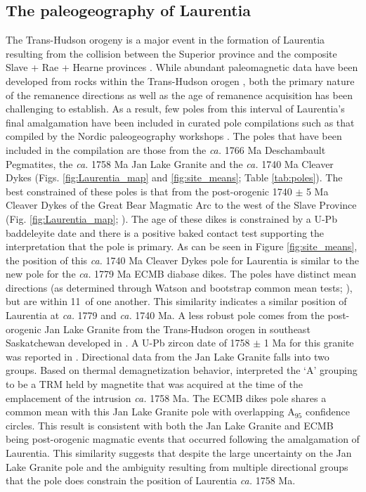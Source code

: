 \documentclass[draft]{agujournal2019}
\begin{document}
\subsection*{The paleogeography of Laurentia}

The Trans-Hudson orogeny is a major event in the formation of Laurentia resulting from the collision between the Superior province and the composite Slave + Rae + Hearne provinces \cite{Corrigan2009a}. While abundant paleomagnetic data have been developed from rocks within the Trans-Hudson orogen \cite{Symons2005a}, both the primary nature of the remanence directions as well as the age of remanence acquisition has been challenging to establish. As a result, few poles from this interval of Laurentia's final amalgamation have been included in curated pole compilations such as that compiled by the Nordic paleogeography workshops \cite{Evans2021a}. The poles that have been included in the  compilation are those from the \textit{ca.} 1766 Ma Deschambault Pegmatites, the \textit{ca.} 1758 Ma Jan Lake Granite and the \textit{ca.} 1740 Ma Cleaver Dykes (Figs. \ref{fig:Laurentia_map} and \ref{fig:site_means}; Table \ref{tab:poles}). The best constrained of these poles is that from the post-orogenic 1740 $\pm$ 5 Ma Cleaver Dykes of the Great Bear Magmatic Arc to the west of the Slave Province (Fig. \ref{fig:Laurentia_map}; ). The age of these dikes is constrained by a U-Pb baddeleyite date and there is a positive baked contact test supporting the interpretation that the pole is primary. As can be seen in Figure \ref{fig:site_means}, the position of this \textit{ca.} 1740 Ma Cleaver Dykes pole for Laurentia is similar to the new pole for the \textit{ca.} 1779 Ma ECMB diabase dikes. The poles have distinct mean directions (as determined through Watson and bootstrap common mean tests; ), but are within 11\textdegree\ of one another. This similarity indicates a similar position of Laurentia at \textit{ca.} 1779 and \textit{ca.} 1740 Ma. A less robust pole comes from the post-orogenic Jan Lake Granite from the Trans-Hudson orogen in southeast Saskatchewan developed in . A U-Pb zircon date of 1758 $\pm$ 1 Ma for this granite was reported in . Directional data from the Jan Lake Granite falls into two groups. Based on thermal demagnetization behavior,  interpreted the `A' grouping to be a TRM held by magnetite that was acquired at the time of the emplacement of the intrusion \textit{ca.} 1758 Ma.  The ECMB dikes pole shares a common mean with this Jan Lake Granite pole with overlapping A$_{95}$ confidence circles. This result is consistent with both the Jan Lake Granite and ECMB being post-orogenic magmatic events that occurred following the amalgamation of Laurentia. This similarity suggests that despite the large uncertainty on the Jan Lake Granite pole and the ambiguity resulting from multiple directional groups that the pole does constrain the position of Laurentia \textit{ca.} 1758 Ma.
\end{document}
